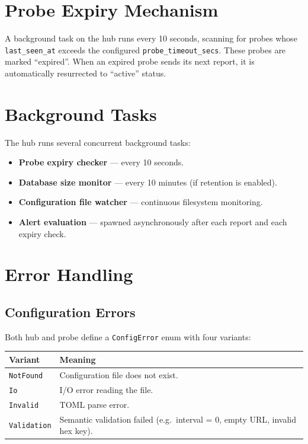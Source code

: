 \documentclass[12pt]{report}
\begin{document}
\section{Probe Expiry Mechanism}

A background task on the hub runs every 10 seconds, scanning for probes whose
\texttt{last\_seen\_at} exceeds the configured \texttt{probe\_timeout\_secs}.
These probes are marked ``expired''. When an expired probe sends its next
report, it is automatically resurrected to ``active'' status.

\section{Background Tasks}

The hub runs several concurrent background tasks:

\begin{itemize}
    \item \textbf{Probe expiry checker} --- every 10 seconds.
    \item \textbf{Database size monitor} --- every 10 minutes (if retention is
          enabled).
    \item \textbf{Configuration file watcher} --- continuous filesystem
          monitoring.
    \item \textbf{Alert evaluation} --- spawned asynchronously after each
          report and each expiry check.
\end{itemize}

\section{Error Handling}

\subsection{Configuration Errors}

Both hub and probe define a \texttt{ConfigError} enum with four variants:

\begin{longtable}{@{} l p{8cm} @{}}
\toprule
\textbf{Variant} & \textbf{Meaning} \\
\midrule
\texttt{NotFound} & Configuration file does not exist. \\
\texttt{Io} & I/O error reading the file. \\
\texttt{Invalid} & TOML parse error. \\
\texttt{Validation} & Semantic validation failed (e.g.\ interval = 0,
    empty URL, invalid hex key). \\
\bottomrule
\end{longtable}
\end{document}
